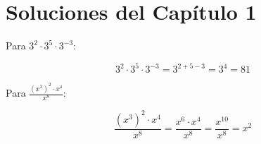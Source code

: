 \documentclass[12pt,a4paper]{book}
\newenvironment{solucion}{%
    \begin{trivlist}\item[\hskip \labelsep {\bfseries Solución.}]
    \color{blue}
}{%
    \color{black}
    \end{trivlist}
}
\begin{document}
\section{Soluciones del Capítulo 1}

\begin{solucion}
Para $3^2 \cdot 3^5 \cdot 3^{-3}$:

$$3^2 \cdot 3^5 \cdot 3^{-3} = 3^{2+5-3} = 3^4 = 81$$
\end{solucion}

\begin{solucion}
Para $\frac{(x^3)^2 \cdot x^4}{x^8}$:

$$\frac{(x^3)^2 \cdot x^4}{x^8} = \frac{x^6 \cdot x^4}{x^8} = \frac{x^{10}}{x^8} = x^2$$
\end{solucion}
\end{document}
